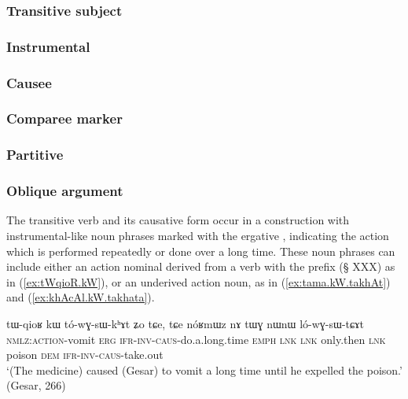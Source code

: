 \subsubsection{Transitive subject} \label{sec:A.kW}
\subsubsection{Instrumental} \label{sec:instr.kW}

\subsubsection{Causee} \label{sec:causee.kW}
\subsubsection{Comparee marker} \label{sec:comparee.kW}

\subsubsection{Partitive} \label{sec:partitive.kW}
\subsubsection{Oblique argument} \label{sec:oblique.kW}
 The transitive verb  and its causative form  occur in a construction with instrumental-like noun phrases marked with the ergative , indicating the action which is performed repeatedly or done over a long time. These noun phrases can include either an action nominal derived from a verb with the prefix  (§ XXX) as in (\ref{ex:tWqioR.kW}), or an underived action noun, as in (\ref{ex:tama.kW.takhAt}) and (\ref{ex:khAcAl.kW.takhata}).  
 
  \begin{exe}
\ex \label{ex:tWqioR.kW}
\gll tɯ-qioʁ kɯ tó-wɣ-sɯ-kʰɤt ʑo tɕe, tɕe nóʁmɯz nɤ tɯɣ nɯnɯ ló-wɣ-sɯ-tɕɤt  \\
\textsc{nmlz:action}-vomit \textsc{erg} \textsc{ifr-inv-caus}-do.a.long.time \textsc{emph} \textsc{lnk} \textsc{lnk} only.then \textsc{lnk} poison \textsc{dem} \textsc{ifr-inv-caus}-take.out \\
\glt `(The medicine) caused (Gesar) to vomit a long time until he expelled the poison.' (Gesar, 266)
\end{exe}

